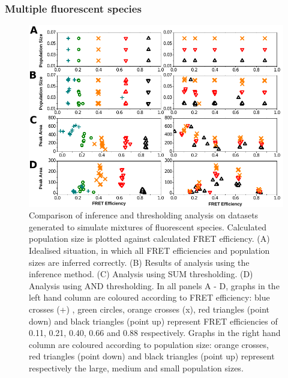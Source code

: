 \subsubsection*{Multiple fluorescent species}

\begin{figure}
   \begin{center}
      \includegraphics*[trim=0.8cm 0cm 0cm 0cm, clip=true, width=6in]{inference/fig5_labelled_multi_fig.pdf}
      \caption{Comparison of inference and thresholding analysis on datasets generated to simulate mixtures of fluorescent species.  Calculated population size is plotted against calculated FRET efficiency.  (A) Idealised situation, in which all FRET efficiencies and population sizes are inferred correctly. (B) Results of analysis using the inference method. (C) Analysis using SUM thresholding. (D) Analysis using AND thresholding. In all panels A - D, graphs in the left hand column are coloured according to FRET efficiency: blue crosses (+) , green circles, orange crosses (x), red triangles (point down) and black triangles (point up) represent FRET efficiencies of 0.11, 0.21, 0.40, 0.66 and 0.88 respectively. Graphs in the right hand column are coloured according to population size: orange crosses, red triangles (point down) and black triangles (point up) represent respectively the large, medium and small population sizes.}
      \label{fig:fig5_synthetic_multi}
   \end{center}
\end{figure}


